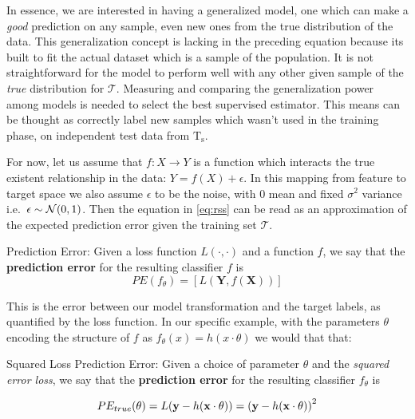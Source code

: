 
In essence, we are interested in having a generalized model, one which can make a \textit{good} prediction on any sample, even new ones from the true distribution of the data.
This generalization concept is lacking in the preceding equation because its built to fit the actual dataset which is a sample of the population.
It is not straightforward for the model to perform well with any other given sample of the \textit{true} distribution for $\mathcal{T}$.
Measuring and comparing the generalization power among models is needed to select the best supervised estimator.
This means can be thought as correctly label new samples which wasn't used in the training phase, on independent test data from $\mathrm{T_s}$.


For now, let us assume that $f: X \rightarrow Y$ is a function which interacts the true existent relationship in the data: $Y = f(X) + \epsilon$.
In this mapping from feature to target space we also assume $\epsilon$ to be the noise, with $0$ mean and fixed $\sigma^2$ variance i.e.\ $\epsilon \sim \operatorname{\mathcal{N}}(0,1)$.
Then the equation in \cref{eq:rss} can be read as an approximation of the expected prediction error given the training set $\mathcal{T}$.


\begin{definition}{Prediction Error:}
	Given a loss function $L(\cdot,\cdot)$ and a function $f$, we say that the \textbf{prediction error} for the resulting classifier $f$ is
	\[
	PE(f_\theta)= \left[ L(\textbf{Y},f(\textbf{X}))\right]
	\]
\end{definition}

This is the error between our model transformation and the target labels, as quantified by the loss function.
 In our specific example, with the parameters $\theta$ encoding the structure of $f$ as $f_\theta(x) = h(x \cdot \theta)$ we would that that:

\begin{definition}{Squared Loss Prediction Error:}
	Given a choice of parameter $\theta$ and the \textit{squared error loss}, we say that the \textbf{prediction error} for the resulting classifier $f_\theta$ is

	\begin{equation}
	PE_{true}(\theta) =L(\textbf{y} - h(\textbf{x} \cdot \theta) )  \\
	=  {(\textbf{y} - h(\textbf{x} \cdot \theta) )}^2
	\end{equation}

\end{definition}

